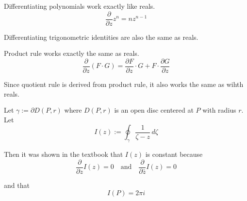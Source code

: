 \def\pp#1#2{\frac{\partial #1}{\partial #2}}

\label{f107aed}

Differentiating polynomials work exactly like reals.
$$
  \pp{}z z^n=nz^{n-1}
$$

Differentiating trigonometric identities are also the same as reals.

Product rule works exactly the same as reals.
$$
  \pp{}z(F\cdot G)=\pp Fz\cdot G+F\cdot\pp Gz
$$

Since quotient rule is derived from product rule, it also works the same as
wihth reals.

\label{fbc836e}

Let $\gamma:=\partial D(P,r)$ where $D(P,r)$ is an open disc centered at $P$
with radius $r$. Let
$$
  I(z):=\oint_\gamma\frac1{\zeta-z}\,d\zeta
$$

Then it was shown in the textbook that $I(z)$ is constant because
$$
  \pp{}zI(z)=0\quad\text{and}\quad\pp{}{\bar z}I(z)=0
$$

and that
$$
  I(P)=2\pi i
$$